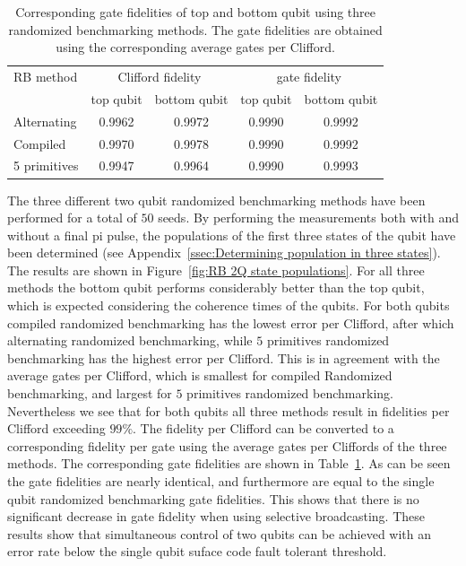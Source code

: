       \begin{table}
        \begin{tabular}{l c c c c}
          \toprule
          RB method     & \multicolumn{2}{c}{Clifford fidelity} & \multicolumn{2}{c}{gate fidelity}\\
          \cmidrule(lr){2-3}
          \cmidrule(lr){4-5}
                        & top qubit & bottom qubit & top qubit & bottom qubit \\
          \midrule
          Alternating   & 0.9962 & 0.9972 & 0.9990 & 0.9992 \\
          Compiled      & 0.9970 & 0.9978 & 0.9990 & 0.9992 \\
          5 primitives  & 0.9947 & 0.9964 & 0.9990 & 0.9993 \\
          \bottomrule
        \end{tabular}
        \caption{Corresponding gate fidelities of top and bottom qubit using three randomized benchmarking methods. The gate fidelities are obtained using the corresponding average gates per Clifford.}
        \label{tab:RB 2Q converted gate fidelities}
      \end{table}

          The three different two qubit randomized benchmarking methods have been performed for a total of $50$ seeds. By performing the measurements both with and without a final pi pulse, the populations of the first three states of the qubit have been determined (see Appendix~\ref{ssec:Determining population in three states}). The results are shown in Figure~\ref{fig:RB 2Q state populations}. For all three methods the bottom qubit performs considerably better than the top qubit, which is expected considering the coherence times of the qubits. For both qubits compiled randomized benchmarking has the lowest error per Clifford, after which alternating randomized benchmarking, while $5$ primitives randomized benchmarking has the highest error per Clifford. This is in agreement with the average gates per Clifford, which is smallest for compiled Randomized benchmarking, and largest for $5$ primitives randomized benchmarking. Nevertheless we see that for both qubits all three methods result in fidelities per Clifford exceeding $99\%$. The fidelity per Clifford can be converted to a corresponding fidelity per gate using the average gates per Cliffords of the three methods. The corresponding gate fidelities are shown in Table~\ref{tab:RB 2Q converted gate fidelities}. As can be seen the gate fidelities are nearly identical, and furthermore are equal to the single qubit randomized benchmarking gate fidelities. This shows that there is no significant decrease in gate fidelity when using selective broadcasting. These results show that simultaneous control of two qubits can be achieved with an error rate below the single qubit suface code fault tolerant threshold.


